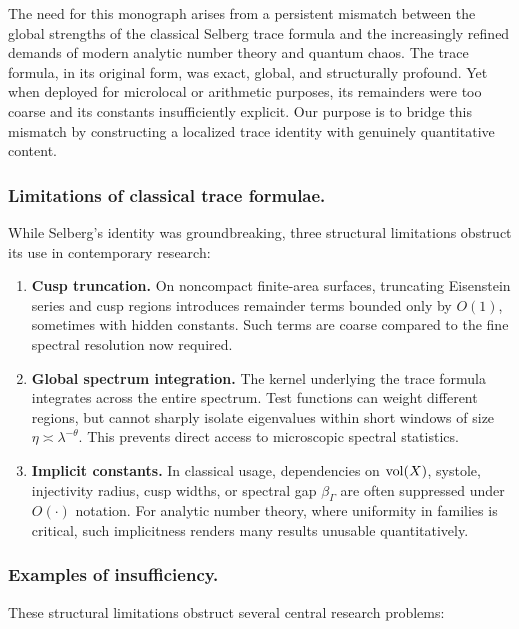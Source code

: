 The need for this monograph arises from a persistent mismatch between the global
strengths of the classical Selberg trace formula and the increasingly refined demands
of modern analytic number theory and quantum chaos. The trace formula, in its
original form, was exact, global, and structurally profound. Yet when deployed for
microlocal or arithmetic purposes, its remainders were too coarse and its constants
insufficiently explicit. Our purpose is to bridge this mismatch by constructing a
localized trace identity with genuinely quantitative content.

\subsubsection*{Limitations of classical trace formulae.}
While Selberg’s identity was groundbreaking, three structural limitations obstruct
its use in contemporary research:

\begin{enumerate}[label=\arabic*.]
  \item \textbf{Cusp truncation.}
  On noncompact finite-area surfaces, truncating Eisenstein series and cusp regions
  introduces remainder terms bounded only by $O(1)$, sometimes with hidden constants.
  Such terms are coarse compared to the fine spectral resolution now required.

  \item \textbf{Global spectrum integration.}
  The kernel underlying the trace formula integrates across the entire spectrum.
  Test functions can weight different regions, but cannot sharply isolate eigenvalues
  within short windows of size $\eta\asymp\lambda^{-\theta}$. This prevents direct
  access to microscopic spectral statistics.

  \item \textbf{Implicit constants.}
  In classical usage, dependencies on $\operatorname{vol}(X)$, systole, injectivity radius,
  cusp widths, or spectral gap $\beta_\Gamma$ are often suppressed under
  $O(\cdot)$ notation. For analytic number theory, where uniformity in families
  is critical, such implicitness renders many results unusable quantitatively.
\end{enumerate}

\subsubsection*{Examples of insufficiency.}
These structural limitations obstruct several central research problems:

